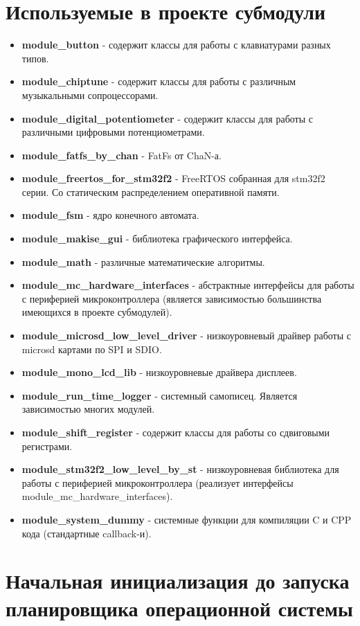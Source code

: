 \documentclass[a4paper, 12pt]{article}
\begin{document}
\section{Используемые в проекте субмодули}
\begin{itemize}
	\item \textbf{module\_button} - содержит классы для работы с клавиатурами разных типов.
	\item \textbf{module\_chiptune} - содержит классы для работы с различным музыкальными сопроцессорами.
	\item \textbf{module\_digital\_potentiometer} - содержит классы для работы с различными цифровыми потенциометрами.
	\item \textbf{module\_fatfs\_by\_chan} - FatFs от ChaN-а.
	\item \textbf{module\_freertos\_for\_stm32f2} - FreeRTOS собранная для stm32f2 серии. Со статическим распределением оперативной памяти.
	\item \textbf{module\_fsm} - ядро конечного автомата.
	\item \textbf{module\_makise\_gui} - библиотека графического интерфейса.
	\item \textbf{module\_math} - различные математические алгоритмы.
	\item \textbf{module\_mc\_hardware\_interfaces} - абстрактные интерфейсы для работы с периферией микроконтроллера (является зависимостью большинства имеющихся в проекте субмодулей).
	\item \textbf{module\_microsd\_low\_level\_driver} - низкоуровневый драйвер работы с microsd картами по SPI и SDIO. 
	\item \textbf{module\_mono\_lcd\_lib} - низкоуровневые драйвера дисплеев.
	\item \textbf{module\_run\_time\_logger} - системный самописец. Является зависимостью многих модулей.
	\item \textbf{module\_shift\_register} - содержит классы для работы со сдвиговыми регистрами.
	\item \textbf{module\_stm32f2\_low\_level\_by\_st} - низкоуровневая библиотека для работы с периферией микроконтроллера (реализует интерфейсы module\_mc\_hardware\_interfaces).
	\item \textbf{module\_system\_dummy} - системные функции для компиляции C и CPP кода (стандартные callback-и).
\end{itemize}

\section{Начальная инициализация до запуска планировщика операционной системы}
\end{document}
